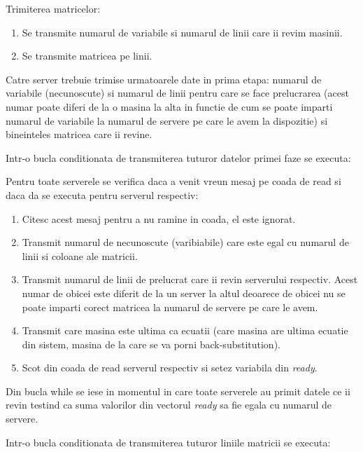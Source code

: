 \documentclass [12pt]{report}
\begin{document}
\pagebreak
Trimiterea matricelor:

\begin{enumerate}
\item Se transmite numarul de variabile si numarul de linii care ii revim
masinii.
\item Se transmite matricea pe linii.
\end{enumerate}

Catre server trebuie trimise urmatoarele date in prima etapa: numarul de variabile
(necunoscute) si numarul de linii pentru care se face prelucrarea (acest
numar poate diferi de la o masina la alta in functie de cum se poate imparti
numarul de variabile la numarul de servere pe care le avem la dispozitie) si
bineinteles matricea care ii revine.

Intr-o bucla conditionata de transmiterea tuturor datelor primei faze se
executa:

Pentru toate serverele se verifica daca a venit vreun mesaj pe coada de read
si daca da se executa pentru serverul respectiv:
\begin{enumerate}
\item Citesc acest mesaj pentru a nu ramine in coada, el este ignorat.
\item Transmit numarul de necunoscute (varibiabile) care este egal cu
numarul de linii si coloane ale matricii.
\item Transmit numarul de linii de prelucrat care ii revin serverului
respectiv. Acest numar de obicei este diferit de la un server la altul
deoarece de obicei nu se poate imparti corect matricea la numarul de servere
pe care le avem.
\item Transmit care masina este ultima ca ecuatii (care masina are ultima
ecuatie din sistem, masina de la care se va porni back-substitution).
\item Scot din coada de read serverul respectiv si setez variabila din {\it
ready}.
\end{enumerate}

Din bucla while se iese in momentul in care toate serverele au primit datele
ce ii revin testind ca suma valorilor din vectorul {\it ready} sa fie egala
cu numarul de servere.

Intr-o bucla conditionata de transmiterea tuturor liniile matricii se
executa:
\end{document}
